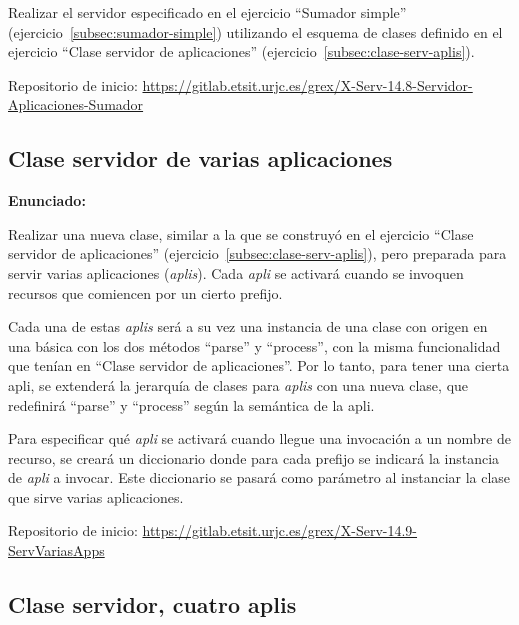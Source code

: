 Realizar el servidor especificado en el ejercicio ``Sumador simple'' (ejercicio~\ref{subsec:sumador-simple}) utilizando el esquema de clases definido en el ejercicio ``Clase servidor de aplicaciones'' (ejercicio~\ref{subsec:clase-serv-aplis}).

Repositorio de inicio: \url{https://gitlab.etsit.urjc.es/grex/X-Serv-14.8-Servidor-Aplicaciones-Sumador}

\subsection{Clase servidor de varias aplicaciones}
\label{subsec:clase-serv-aplis-multi}

\textbf{Enunciado:}

Realizar una nueva clase, similar a la que se construyó en el ejercicio ``Clase servidor de aplicaciones'' (ejercicio~\ref{subsec:clase-serv-aplis}), pero preparada para servir varias aplicaciones (\emph{aplis}). Cada \emph{apli} se activará cuando se invoquen recursos que comiencen por un cierto prefijo.

Cada una de estas \emph{aplis} será a su vez una instancia de una clase con origen en una básica con los dos métodos ``parse'' y ``process'', con la misma funcionalidad que tenían en ``Clase servidor de aplicaciones''. Por lo tanto, para tener una cierta apli, se extenderá la jerarquía de clases para \emph{aplis} con una nueva clase, que redefinirá ``parse'' y ``process'' según la semántica de la apli.

Para especificar qué \emph{apli} se activará cuando llegue una invocación a un nombre de recurso, se creará un diccionario donde para cada prefijo se indicará la instancia de \emph{apli} a invocar. Este diccionario se pasará como parámetro al instanciar la clase que sirve varias aplicaciones.

Repositorio de inicio: \url{https://gitlab.etsit.urjc.es/grex/X-Serv-14.9-ServVariasApps}

\subsection{Clase servidor, cuatro aplis}
\label{subsec:clase-serv-aplis-varias}

